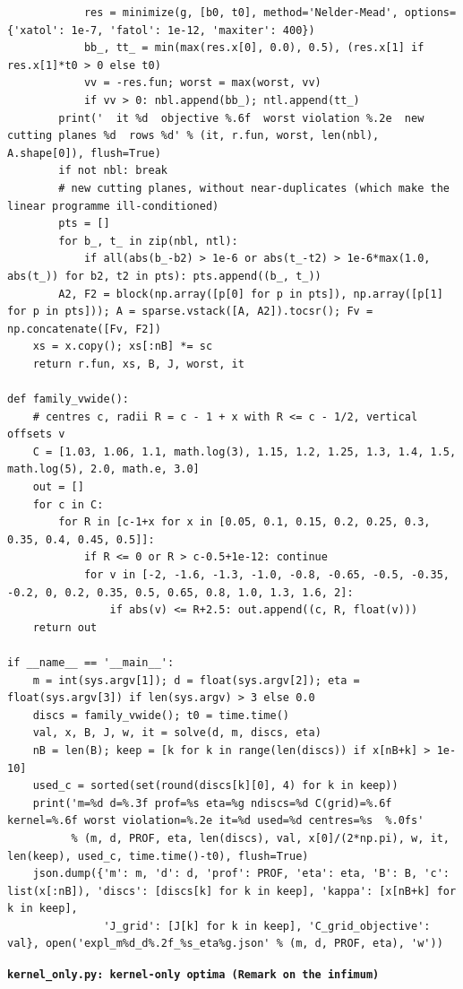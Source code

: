 \documentclass[11pt,reqno]{amsart}
\numberwithin{equation}{section}
\theoremstyle{definition}
\theoremstyle{remark}
\newcommand{\appsub}[1]{\par\medskip\noindent\textbf{#1}\par\nobreak\smallskip}
\begin{document}
\begin{lstlisting}
            res = minimize(g, [b0, t0], method='Nelder-Mead', options={'xatol': 1e-7, 'fatol': 1e-12, 'maxiter': 400})
            bb_, tt_ = min(max(res.x[0], 0.0), 0.5), (res.x[1] if res.x[1]*t0 > 0 else t0)
            vv = -res.fun; worst = max(worst, vv)
            if vv > 0: nbl.append(bb_); ntl.append(tt_)
        print('  it %d  objective %.6f  worst violation %.2e  new cutting planes %d  rows %d' % (it, r.fun, worst, len(nbl), A.shape[0]), flush=True)
        if not nbl: break
        # new cutting planes, without near-duplicates (which make the linear programme ill-conditioned)
        pts = []
        for b_, t_ in zip(nbl, ntl):
            if all(abs(b_-b2) > 1e-6 or abs(t_-t2) > 1e-6*max(1.0, abs(t_)) for b2, t2 in pts): pts.append((b_, t_))
        A2, F2 = block(np.array([p[0] for p in pts]), np.array([p[1] for p in pts])); A = sparse.vstack([A, A2]).tocsr(); Fv = np.concatenate([Fv, F2])
    xs = x.copy(); xs[:nB] *= sc
    return r.fun, xs, B, J, worst, it

def family_vwide():
    # centres c, radii R = c - 1 + x with R <= c - 1/2, vertical offsets v
    C = [1.03, 1.06, 1.1, math.log(3), 1.15, 1.2, 1.25, 1.3, 1.4, 1.5, math.log(5), 2.0, math.e, 3.0]
    out = []
    for c in C:
        for R in [c-1+x for x in [0.05, 0.1, 0.15, 0.2, 0.25, 0.3, 0.35, 0.4, 0.45, 0.5]]:
            if R <= 0 or R > c-0.5+1e-12: continue
            for v in [-2, -1.6, -1.3, -1.0, -0.8, -0.65, -0.5, -0.35, -0.2, 0, 0.2, 0.35, 0.5, 0.65, 0.8, 1.0, 1.3, 1.6, 2]:
                if abs(v) <= R+2.5: out.append((c, R, float(v)))
    return out

if __name__ == '__main__':
    m = int(sys.argv[1]); d = float(sys.argv[2]); eta = float(sys.argv[3]) if len(sys.argv) > 3 else 0.0
    discs = family_vwide(); t0 = time.time()
    val, x, B, J, w, it = solve(d, m, discs, eta)
    nB = len(B); keep = [k for k in range(len(discs)) if x[nB+k] > 1e-10]
    used_c = sorted(set(round(discs[k][0], 4) for k in keep))
    print('m=%d d=%.3f prof=%s eta=%g ndiscs=%d C(grid)=%.6f kernel=%.6f worst violation=%.2e it=%d used=%d centres=%s  %.0fs'
          % (m, d, PROF, eta, len(discs), val, x[0]/(2*np.pi), w, it, len(keep), used_c, time.time()-t0), flush=True)
    json.dump({'m': m, 'd': d, 'prof': PROF, 'eta': eta, 'B': B, 'c': list(x[:nB]), 'discs': [discs[k] for k in keep], 'kappa': [x[nB+k] for k in keep],
               'J_grid': [J[k] for k in keep], 'C_grid_objective': val}, open('expl_m%d_d%.2f_%s_eta%g.json' % (m, d, PROF, eta), 'w'))
\end{lstlisting}
\appsub{\texttt{kernel\_only.py: kernel-only optima (Remark on the infimum)}}
\end{document}
